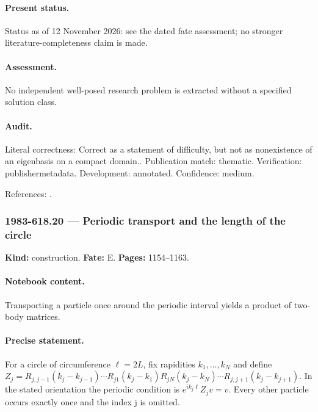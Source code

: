 \paragraph{Present status.} Status as of 12 November 2026: see the dated fate assessment; no stronger literature-completeness claim is made.

\paragraph{Assessment.} No independent well-posed research problem is extracted without a specified solution class.

\paragraph{Audit.} Literal correctness: Correct as a statement of difficulty, but not as nonexistence of an eigenbasis on a compact domain.. Publication match: thematic. Verification: publishermetadata. Development: annotated. Confidence: medium.

\noindent References: \citep{yang1968smatrix}.\par

\subsubsection{1983-618.20 --- Periodic transport and the length of the circle}

\label{item:1983-618.20}

\noindent\textbf{Kind:} construction. \textbf{Fate:} E. \textbf{Pages:} 1154--1163.\par

\paragraph{Notebook content.} Transporting a particle once around the periodic interval yields a product of two-body matrices.

\paragraph{Precise statement.} For a circle of circumference $\ell=2L$, fix rapidities $k_1,\ldots,k_N$ and define $Z_j=R_{j,j-1}(k_j-k_{j-1})\cdots R_{j1}(k_j-k_1)R_{jN}(k_j-k_N)\cdots R_{j,j+1}(k_j-k_{j+1})$. In the stated orientation the periodic condition is $e^{ik_j\ell}Z_jv=v$. Every other particle occurs exactly once and the index j is omitted.

